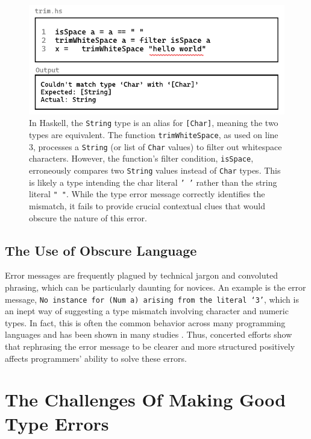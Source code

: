 \begin{figure}[hbt]
  \includegraphics[width=\linewidth]{TypeErrorExample3}
  \caption{
    \label{fig:type-error-example-3}
    In Haskell, the \texttt{String} type is an alias for \texttt{[Char]}, meaning the two types are equivalent. The function \texttt{trimWhiteSpace}, as used on line 3, processes a \texttt{String} (or list of \texttt{Char} values) to filter out whitespace characters. However, the function’s filter condition, \texttt{isSpace}, erroneously compares two \texttt{String} values instead of \texttt{Char} types. This is likely a type intending the char literal \texttt{' '} rather than the string literal \texttt{" "}. While the type error message correctly identifies the mismatch, it fails to provide crucial contextual clues that would obscure the nature of this error.
    }
\end{figure}


\subsection{The Use of Obscure Language}

Error messages are frequently plagued by technical jargon and convoluted phrasing, which can be particularly daunting for novices. An example is the error message, \texttt{No instance for (Num a) arising from the literal `3'}, which is an inept way of suggesting a type mismatch involving character and numeric types. In fact, this is often the common behavior across many programming languages and has been shown in many studies \cite{Barik2017-gy, Tirronen2015-nr, Prather2017-dg}. Thus, concerted efforts \cite{Becker2016-kc, Barik2014-ib}  show that rephrasing the error message to be clearer and more structured positively affects programmers' ability to solve these errors.


\section{The Challenges Of Making Good Type Errors}

